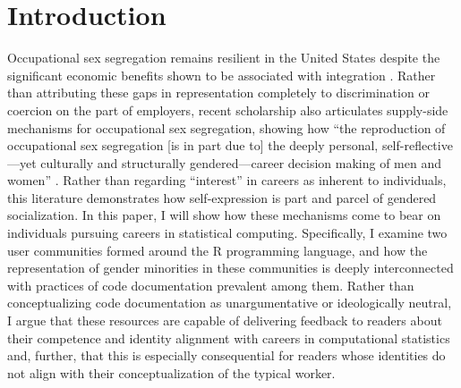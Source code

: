 \section{Introduction}\label{sec:intro}

Occupational sex segregation remains resilient in the United States despite the significant economic benefits shown to be associated with integration \cite{sex_seg}. Rather than attributing these gaps in representation completely to discrimination or coercion on the part of employers, recent scholarship also articulates supply-side mechanisms for occupational sex segregation, showing how ``the reproduction of occupational sex segregation [is in part due to] the deeply personal, self-reflective---yet culturally and structurally gendered---career decision making of men and women'' \cite{cech_self-expressive_2013}. Rather than regarding ``interest'' in careers as inherent to individuals, this literature demonstrates how self-expression is part and parcel of gendered socialization. In this paper, I will show how these mechanisms come to bear on individuals pursuing careers in statistical computing. Specifically, I examine two user communities formed around the R programming language, and how the representation of gender minorities in these communities is deeply interconnected with practices of code documentation prevalent among them. Rather than conceptualizing code documentation as unargumentative or ideologically neutral, I argue that these resources are capable of delivering feedback to readers about their competence and identity alignment with careers in computational statistics and, further, that this is especially consequential for readers whose identities do not align with their conceptualization of the typical worker.

